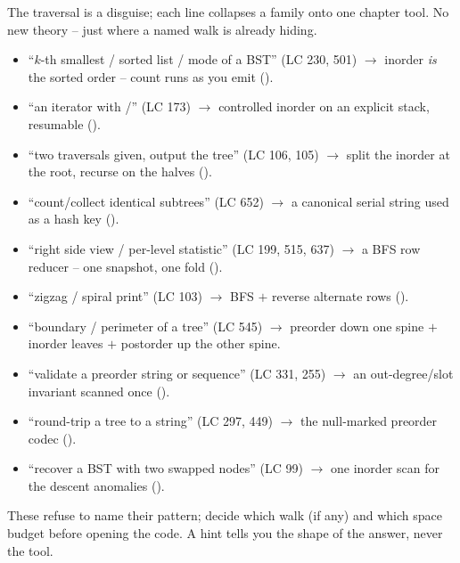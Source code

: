 
The traversal is a disguise; each line collapses a family onto one chapter tool. No new
theory -- just where a named walk is already hiding.

\begin{itemize}[nosep, leftmargin=1.4em]
  \item ``$k$-th smallest / sorted list / mode of a BST'' (LC 230, 501) $\longrightarrow$
        inorder \emph{is} the sorted order -- count runs as you emit ().
  \item ``an iterator with /'' (LC 173) $\longrightarrow$
        controlled inorder on an explicit stack, resumable ().
  \item ``two traversals given, output the tree'' (LC 106, 105) $\longrightarrow$
        split the inorder at the root, recurse on the halves ().
  \item ``count/collect identical subtrees'' (LC 652) $\longrightarrow$ a canonical
        serial string used as a hash key ().
  \item ``right side view / per-level statistic'' (LC 199, 515, 637) $\longrightarrow$ a
        BFS row reducer -- one snapshot, one fold ().
  \item ``zigzag / spiral print'' (LC 103) $\longrightarrow$ BFS $+$ reverse alternate
        rows ().
  \item ``boundary / perimeter of a tree'' (LC 545) $\longrightarrow$ preorder down one
        spine $+$ inorder leaves $+$ postorder up the other spine.
  \item ``validate a preorder string or sequence'' (LC 331, 255) $\longrightarrow$ an
        out-degree/slot invariant scanned once ().
  \item ``round-trip a tree to a string'' (LC 297, 449) $\longrightarrow$ the null-marked
        preorder codec ().
  \item ``recover a BST with two swapped nodes'' (LC 99) $\longrightarrow$ one inorder
        scan for the descent anomalies ().
\end{itemize}


These refuse to name their pattern; decide which walk (if any) and which space budget
before opening the code. A hint tells you the shape of the answer, never the tool.

